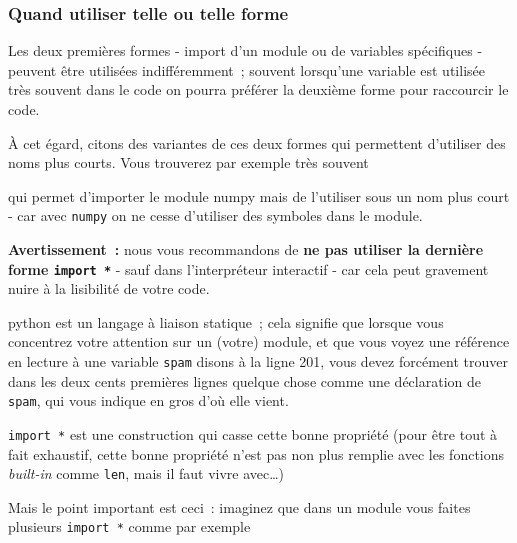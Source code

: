     \hypertarget{quand-utiliser-telle-ou-telle-forme}{%
\subsubsection{Quand utiliser telle ou telle
forme}\label{quand-utiliser-telle-ou-telle-forme}}

    Les deux premières formes - import d'un module ou de variables
spécifiques - peuvent être utilisées indifféremment~; souvent lorsqu'une
variable est utilisée très souvent dans le code on pourra préférer la
deuxième forme pour raccourcir le code.

    À cet égard, citons des variantes de ces deux formes qui permettent
d'utiliser des noms plus courts. Vous trouverez par exemple très souvent

\begin{Shaded}
\begin{Highlighting}[frame=lines,framerule=0.6mm,rulecolor=\color{asisframecolor}]
\end{Highlighting}
\end{Shaded}

qui permet d'importer le module numpy mais de l'utiliser sous un nom
plus court - car avec \texttt{numpy} on ne cesse d'utiliser des symboles
dans le module.

    \textbf{Avertissement~:} nous vous recommandons de \textbf{ne pas
utiliser la dernière forme \texttt{import\ *}} - sauf dans
l'interpréteur interactif - car cela peut gravement nuire à la
lisibilité de votre code.

    python est un langage à liaison statique~; cela signifie que lorsque
vous concentrez votre attention sur un (votre) module, et que vous voyez
une référence en lecture à une variable \texttt{spam} disons à la ligne
201, vous devez forcément trouver dans les deux cents premières lignes
quelque chose comme une déclaration de \texttt{spam}, qui vous indique
en gros d'où elle vient.

\texttt{import\ *} est une construction qui casse cette bonne propriété
(pour être tout à fait exhaustif, cette bonne propriété n'est pas non
plus remplie avec les fonctions \emph{built-in} comme \texttt{len}, mais
il faut vivre avec\ldots{})

Mais le point important est ceci~: imaginez que dans un module vous
faites plusieurs \texttt{import\ *} comme par exemple

\begin{Shaded}
\begin{Highlighting}[frame=lines,framerule=0.6mm,rulecolor=\color{asisframecolor}]
 \OperatorTok{*}
 \OperatorTok{*}
\end{Highlighting}
\end{Shaded}

